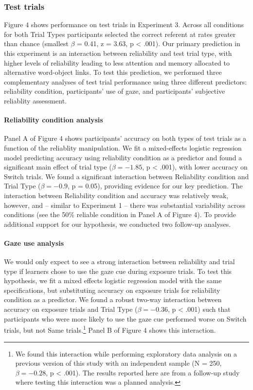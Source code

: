 \documentclass[authoryear, review]{elsarticle}
\begin{document}
\subsubsection{Test trials}\label{test-trials-2}

Figure 4 shows performance on test trials in Experiment 3. Across all
conditions for both Trial Types participants selected the correct
referent at rates greater than chance (smallest \(\beta\) = 0.41, z =
3.63, p \textless{} .001). Our primary prediction in this experiment is
an interaction between reliability and test trial type, with higher
levels of reliability leading to less attention and memory allocated to
alternative word-object links. To test this prediction, we performed
three complementary analyses of test trial performance using three
different predictors: reliability condition, participants' use of gaze,
and participants' subjective reliablity assessment.

\paragraph{Reliability condition
analysis}\label{reliability-condition-analysis}

Panel A of Figure 4 shows participants' accuracy on both types of test
trials as a function of the reliablity manipulation. We fit a
mixed-effects logistic regression model predicting accuracy using
reliability condition as a predictor and found a significant main effect
of trial type (\(\beta = -1.85\), p \textless{} .001), with lower
accuracy on Switch trials. We found a significant interaction between
Reliability condition and Trial Type (\(\beta = -0.9\), p = 0.05),
providing evidence for our key prediction. The interaction between
Reliability condition and accuracy was relatively weak, however, and --
similar to Experiment 1 -- there was substantial variability across
conditions (see the 50\% reliable condition in Panel A of Figure 4). To
provide additional support for our hypothesis, we conducted two
follow-up analyses.

\paragraph{Gaze use analysis}\label{gaze-use-analysis}

We would only expect to see a strong interaction between reliability and
trial type if learners chose to use the gaze cue during exposure trials.
To test this hypothesis, we fit a mixed effects logistic regression
model with the same specifications, but substituting accuracy on
exposure trials for reliability condition as a predictor. We found a
robust two-way interaction between accuracy on exposure trials and Trial
Type (\(\beta = -0.36\), p \textless{} .001) such that participants who
were more likely to use the gaze cue performed worse on Switch trials,
but not Same trials.\footnote{We found this interaction while performing
  exploratory data analysis on a previous version of this study with an
  independent sample (N = 250, \(\beta = -0.28\), p \textless{} .001).
  The results reported here are from a follow-up study where testing
  this interaction was a planned analysis.} Panel B of Figure 4 shows
this interaction.
\end{document}
